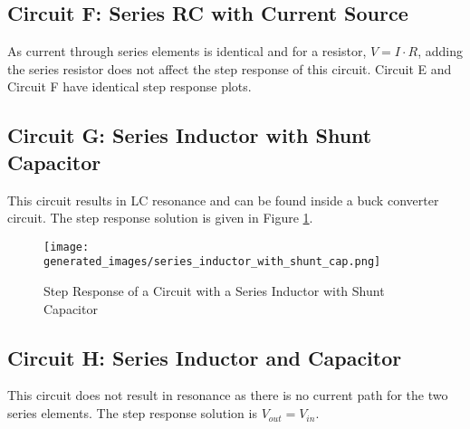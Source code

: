 \documentclass[main.tex]{subfiles}
\begin{document}
\subsection{Circuit F: Series RC with Current Source}
As current through series elements is identical and for a resistor, $V = I \cdot R$, adding the series resistor does not affect the step response of this circuit. Circuit E and Circuit F have identical step response plots.

\subsection{Circuit G: Series Inductor with Shunt Capacitor}
This circuit results in LC resonance and can be found inside a buck converter circuit. The step response solution is given in Figure \ref{fig:step-response-series-ind-with-shunt-cap}.

\begin{figure}[H]
    \centering
    \texttt{[image: generated\_images/series\_inductor\_with\_shunt\_cap.png]}
    \caption{Step Response of a Circuit with a Series Inductor with Shunt Capacitor}
    \label{fig:step-response-series-ind-with-shunt-cap}
\end{figure}

\subsection{Circuit H: Series Inductor and Capacitor}
This circuit does not result in resonance as there is no current path for the two series elements. The step response solution is $V_{out} = V_{in}$. 
\end{document}
